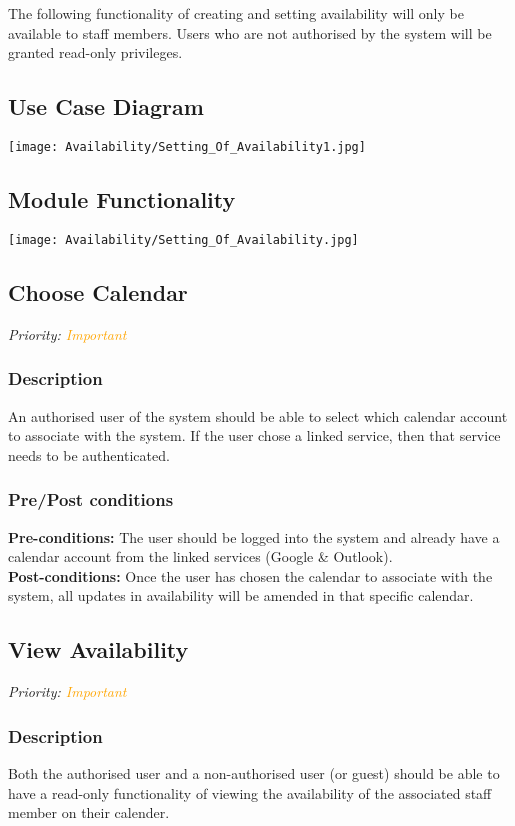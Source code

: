 The following functionality of creating and setting availability will only be available to staff members. Users who are not authorised by the system will be granted read-only privileges.
\subsection{Use Case Diagram}
\texttt{[image: Availability/Setting\_Of\_Availability1.jpg]}

\subsection{Module Functionality}
\texttt{[image: Availability/Setting\_Of\_Availability.jpg]}


\subsection{Choose Calendar}
\textit{Priority: \textcolor{orange}{Important}}
	\subsubsection{Description}
	An authorised user of the system should be able to select which calendar account to associate with the system. If the user chose a linked service, then that service needs to be authenticated.\\
	\subsubsection{Pre/Post conditions}
		\textbf{Pre-conditions:} The user should be logged into the system and already have a calendar account from the linked services (Google \& Outlook). \\
		\textbf{Post-conditions:} Once the user has chosen the calendar to associate with the system, all updates in availability will be amended in that specific calendar.

\subsection{View Availability}
\textit{Priority: \textcolor{orange}{Important}}
	\subsubsection{Description}
	Both the authorised user and a non-authorised user (or guest) should be able to have a read-only functionality of viewing the availability of the associated staff member on their calender.\\
